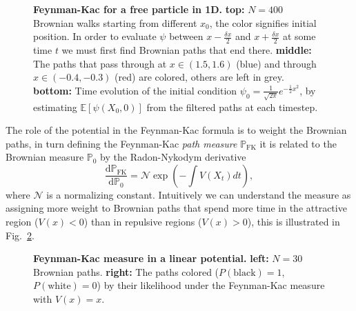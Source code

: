 \begin{figure}[H]
	\caption[Feynman-Kac for a free particle in 1D]{\textbf{Feynman-Kac for a free particle  in 1D.} \textbf{top:} $N=400$ Brownian walks starting from different $x_0$, the color signifies initial position. In order to evaluate $\psi$ between $x-\frac{\delta x}{2}$ and $x+\frac{\delta x}{2}$ at some time $t$ we must first find Brownian paths that end there. \textbf{middle:} The paths that pass through at $x \in (1.5, 1.6)$ (blue) and through $x \in (-0.4,-0.3)$ (red) are colored, others are left in grey. \textbf{bottom:} Time evolution of the initial condition $\psi_{0} = \frac{1}{\sqrt{2 \pi}} e^{-\frac{1}{2} x^{2}}$, by estimating ${\mathbb{E}}\left[\psi\left(X_{0}, 0\right)\right]$ from the filtered paths at each timestep.}
	\label{fig:fk_1d_example}
\end{figure}
\noindent
The role of the potential in the Feynman-Kac formula is to weight the Brownian paths, in turn defining the Feynman-Kac \emph{path measure} $\mathbb{P}_{\mathrm{FK}}$ it is related to the Brownian measure $\mathbb{P}_{0}$ by the Radon-Nykodym derivative
\begin{equation}
\label{eq:RNderiv}
\frac{\mathrm{d} \mathbb{P}_{\mathrm{FK}}}{\mathrm{d} \mathbb{P}_{0}}=\mathcal{N} \exp \left(-\int V\left(X_{t}\right) d t\right),
\end{equation}
where $\mathcal{N}$ is a normalizing constant. Intuitively we can understand the measure as assigning more weight to Brownian paths that spend more time in the attractive region ($V(x) < 0$) than in repulsive regions ($V(x) > 0$), this is illustrated in Fig.~\ref{fig:fkac_measure_reweight}.
\begin{figure}[h]
	\centering
	\caption[Feynman-Kac measure in a linear potential]{\textbf{Feynman-Kac measure in a linear potential.} 
		\textbf{left:} $N=30$ Brownian paths. \textbf{right:} The paths colored ($P(\text{black})=1$, $P(\text{white})=0$) by their likelihood under the Feynman-Kac measure with $V(x)=x$.}
	\label{fig:fkac_measure_reweight}
\end{figure}
